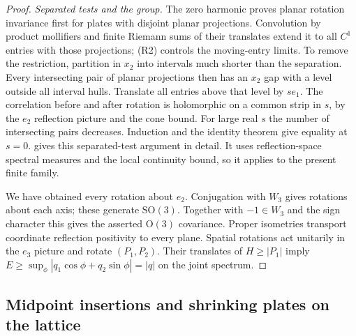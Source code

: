\documentclass[11pt,letterpaper,reqno]{amsart}
\theoremstyle{definition}
\theoremstyle{remark}
\begin{document}
\begin{proof}
\emph{Separated tests and the group.}
The zero harmonic proves planar rotation invariance
first for plates with disjoint planar projections.
Convolution by product mollifiers and finite Riemann
sums of their translates extend it to all $C^1$
entries with those projections; (R2) controls the
moving-entry limits.  To remove the restriction,
partition in $x_2$ into intervals much shorter than
the separation.  Every intersecting pair of planar
projections then has an $x_2$ gap with a level outside
all interval hulls.  Translate all entries above
that level by $se_1$.  The correlation before and
after rotation is holomorphic on a common strip in
$s$, by the $e_2$ reflection picture and the cone
bound.  For large real $s$ the number of intersecting
pairs decreases.  Induction and the identity theorem
give equality at $s=0$.   gives this separated-test argument in detail.
It uses reflection-space spectral measures and the local
continuity bound, so it applies to the present finite family.

We have obtained every rotation about $e_2$.
Conjugation with $W_3$ gives rotations about each
axis; these generate $\mathrm{SO}(3)$.  Together
with $-1\in W_3$ and the sign character this gives
the asserted $\mathrm O(3)$ covariance.  Proper
isometries transport coordinate reflection positivity
to every plane.  Spatial rotations act unitarily
in the $e_3$ picture and rotate $(P_1,P_2)$.
Their translates of $H\ge|P_1|$ imply
$E\ge\sup_\phi|q_1\cos\phi+q_2\sin\phi|=|q|$
on the joint spectrum.
\end{proof}

\subsection{Midpoint insertions and shrinking plates on the lattice}
\end{document}
